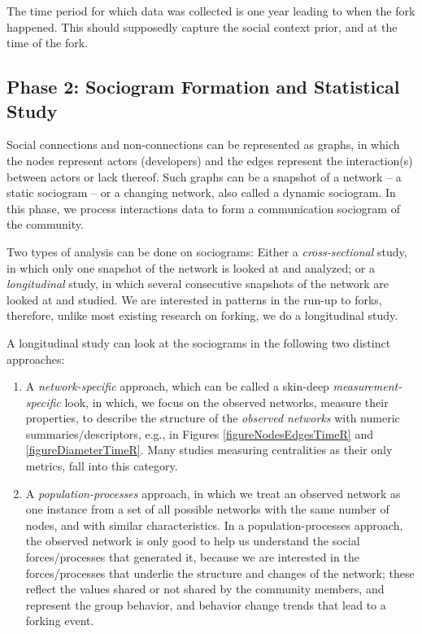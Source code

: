 \documentclass[11pt]{report}
\begin{document}
The time period for which data was collected is one year leading to when the fork happened. This should supposedly capture the social context prior, and at the time of the fork.

\subsection{Phase 2: Sociogram Formation and Statistical Study}

Social connections and non-connections can be represented as graphs, in which the nodes represent actors (developers) and the edges represent the interaction(s) between actors or lack thereof. Such graphs can be a snapshot of a network -- a static sociogram -- or a changing network, also called a dynamic sociogram. In this phase, we process interactions data to form a communication sociogram of the community. 

Two types of analysis can be done on sociograms: Either a \textit{cross-sectional} study, in which only one snapshot of the network is looked at and analyzed; or a \textit{longitudinal} study, in which several consecutive snapshots of the network are looked at and studied.  We are interested in patterns in the run-up to forks, therefore, unlike most existing research on forking, we do a longitudinal study.

A longitudinal study can look at the sociograms in the following two distinct approaches: 
\begin{enumerate}
\item A \textit{network-specific} approach, which can be called a skin-deep \textit{measurement-specific} look, in which, we focus on the observed networks, measure their properties, to describe the structure of the \textit{observed networks} with numeric summaries/descriptors, e.g., in Figures \ref{figureNodesEdgesTimeR} and \ref{figureDiameterTimeR}. Many studies measuring centralities as their only metrics, fall into this category. 

\item A \textit{population-processes} approach, in which we treat an observed network as one instance from a set of all possible networks with the same number of nodes, and with similar characteristics. In a population-processes approach, the observed network is only good to help us understand the social forces/processes that generated it, because we are interested in the forces/processes that underlie the structure and changes of the network; these reflect the values shared or not shared by the community members, and represent the group behavior, and behavior change trends that lead to a forking event. 

\end{enumerate}
\end{document}
